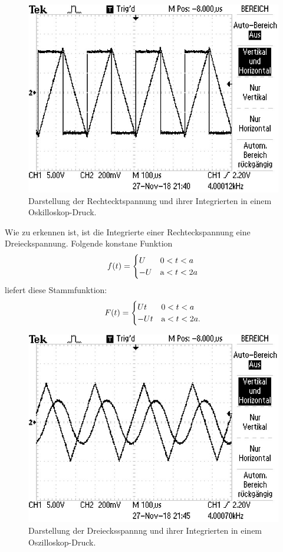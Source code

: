 \begin{figure}[H]
  \centering
  \includegraphics{Rechteck.JPG}
  \caption{Darstellung der Rechtecktspannung und ihrer Integrierten in einem Oskilloskop-Druck.}
  \label{fig:plot}
\end{figure}
\noindent Wie zu erkennen ist, ist die Integrierte einer Rechteckspannung eine Dreieckspannung.
Folgende konstane Funktion
\begin{equation*}
  f(t) =
  \begin{cases}
    U & \text 0 < t < a \\
    -U & \text a < t < 2a \\
  \end{cases}
\end{equation*}
liefert diese Stammfunktion:
\begin{equation*}
  F(t) =
  \begin{cases}
    Ut & \text 0 < t < a \\
    -Ut & \text a < t < 2a .\\
  \end{cases}
\end{equation*}

\begin{figure}[H]
  \centering
  \includegraphics{Dreieck.JPG}
  \caption{Darstellung der Dreiecksspannng und ihrer Integrierten in einem Oszilloskop-Druck.}
  \label{fig:plot}
\end{figure}

